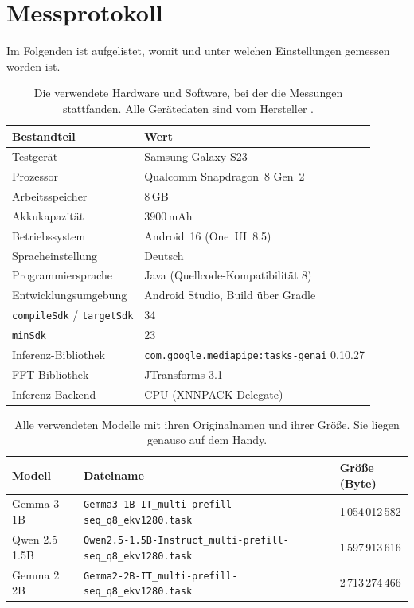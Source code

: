 \chapter{Messprotokoll}
\label{app:messprotokoll}
Im Folgenden ist aufgelistet, womit und unter welchen Einstellungen gemessen worden ist.

\begin{table}[H]
\centering
\caption[Hard- und Software der Messung]{Die verwendete Hardware und Software, bei der die Messungen stattfanden. Alle Gerätedaten sind vom Hersteller \autocite{samsung_s23_specs,s23_oneui85_android16}.}
\label{tab:app-hardsoft}
\begin{tabular}{ll}
\toprule
\textbf{Bestandteil} & \textbf{Wert} \\
\midrule
Testgerät              & Samsung Galaxy S23 \\
Prozessor              & Qualcomm Snapdragon~8 Gen~2 \\
Arbeitsspeicher        & 8\,GB \\
Akkukapazität          & 3900\,mAh \\
Betriebssystem         & Android~16 (One~UI~8.5) \\
Spracheinstellung      & Deutsch \\
\midrule
Programmiersprache     & Java (Quellcode-Kompatibilität 8) \\
Entwicklungsumgebung   & Android Studio, Build über Gradle \\
\texttt{compileSdk} / \texttt{targetSdk} & 34 \\
\texttt{minSdk}        & 23 \\
Inferenz-Bibliothek    & \texttt{com.google.\allowbreak mediapipe:\allowbreak tasks-genai} 0.10.27 \\
\ac{FFT}-Bibliothek    & JTransforms 3.1 \\
Inferenz-Backend       & CPU (XNNPACK-Delegate) \\
\bottomrule
\end{tabular}
\end{table}

\begin{table}[H]
\centering
\caption[Verwendete Modelldateien]{Alle verwendeten Modelle mit ihren Originalnamen und ihrer Größe. Sie liegen genauso auf dem Handy.}
\label{tab:app-modelldateien}
{\footnotesize
\setlength{\tabcolsep}{4pt}
\begin{tabular}{lll}
\toprule
\textbf{Modell} & \textbf{Dateiname} & \textbf{Größe (Byte)} \\
\midrule
Gemma 3 1B \autocite{gemma3_litert}    & \texttt{Gemma3-1B-IT\_\allowbreak multi-prefill-seq\_\allowbreak q8\_ekv1280.task} & 1\,054\,012\,582 \\
Qwen 2.5 1.5B \autocite{qwen_litert}   & \texttt{Qwen2.5-1.5B-Instruct\_\allowbreak multi-prefill-seq\_\allowbreak q8\_ekv1280.task} & 1\,597\,913\,616 \\
Gemma 2 2B \autocite{gemma2_litert}    & \texttt{Gemma2-2B-IT\_\allowbreak multi-prefill-seq\_\allowbreak q8\_ekv1280.task} & 2\,713\,274\,466 \\
\bottomrule
\end{tabular}
}
\end{table}

